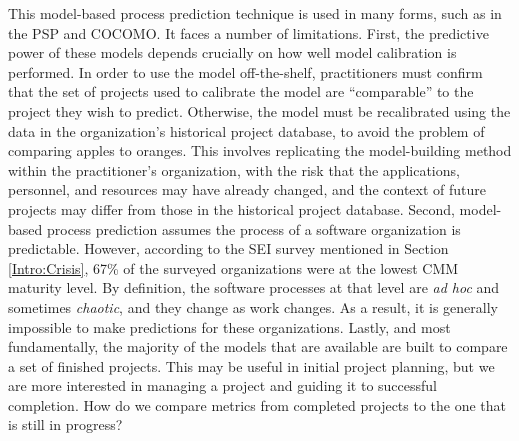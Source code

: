This model-based process prediction technique is used in many forms, such as in the PSP and COCOMO. It faces a number of limitations. First, the predictive power of these models depends crucially on how well model calibration is performed. In order to use the model off-the-shelf, practitioners must confirm that the set of projects used to calibrate the model are ``comparable'' to the project they wish to predict. Otherwise, the model must be recalibrated using the data in the organization's historical project database, to avoid the problem of comparing apples to oranges. This involves replicating the model-building method within the practitioner's organization, with the risk that the applications, personnel, and resources may have already changed, and the context of future projects may differ from those in the historical project database. Second, model-based process prediction assumes the process of a software organization is predictable. However, according to the SEI survey \cite{Peterson:1997} mentioned in Section \ref{Intro:Crisis}, 67\% of the surveyed organizations were at the lowest CMM maturity level. By definition, the software processes at that level are \textit{ad hoc} and sometimes \textit{chaotic}, and they change as work changes. As a result, it is generally impossible to make predictions for these organizations. Lastly, and most fundamentally, the majority of the models that are available are built to compare a set of finished projects. This may be useful in initial project planning, but we are more interested in managing a project and guiding it to successful completion. How do we compare metrics from completed projects to the one that is still in progress?



